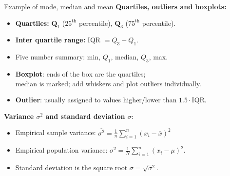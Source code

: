 \documentclass[aspectratio=169,t]{beamer}
\begin{document}
  { 
    \begin{frame}{Example of mode, median and mean}
    \textbf{Quartiles, outliers and boxplots:}
    \begin{itemize}
      \item \textbf{Quartiles:} {\color{blue}$\mathbf{Q}_1$} ($25^{\text{th}}$ percentile), {\color{blue}$\mathbf{Q}_3$} ($75^{\text{th}}$ percentile).
      \item \textbf{Inter quartile range:} {\color{blue}IQR} $=Q_3-Q_1$.
      \item Five number summary: min, $Q_1$, median, $Q_3$, max.
      \item \textbf{Boxplot}: ends of the box are the quartiles; \\ median is marked; add whiskers and plot outliers individually.
      \item \textbf{Outlier}: usually assigned to values higher/lower than $1.5 \cdot \text{IQR}$.
    \end{itemize}
    \textbf{Variance $\sigma^2$ and standard deviation $\sigma$}:
    \begin{itemize}
      \item Empirical sample variance: $\overline{\sigma^2} = \frac{1}{n} \sum_{i=1}^{n}(x_i-\overline{x})^2$
      \item Empirical population variance: $\sigma^2 = \frac{1}{N} \sum_{i=1}^{n} (x_i - \mu)^2$.
      \item Standard deviation is the square root $\sigma = \sqrt{\sigma^2}$.
    \end{itemize}
    \end{frame}
  }
\end{document}
